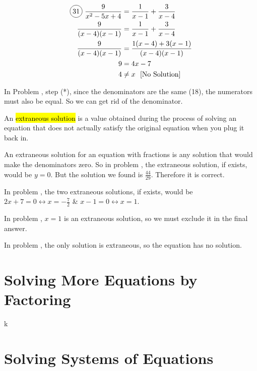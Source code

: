 \begin{multicols}{2}
\begin{align*}
  \circled{31}\ \frac{9}{x^{2}-5x+4}&=\frac{1}{x-1}+\frac{3}{x-4}\\
  \frac{9}{(x-4)(x-1)}&=\frac{1}{x-1}+\frac{3}{x-4}\\
  \frac{9}{(x-4)(x-1)}&=\frac{1(x-4)+3(x-1)}{(x-4)(x-1)}\\
  9&=4x-7\\
  4&\neq x\ \text{ [No Solution]}
\end{align*}
\end{multicols}

In Problem , step (*), since the denominators are the same (18), the numerators must also be equal. So we can get rid of the denominator.

\vspace{.4cm}

An \hl{extraneous solution} is a value obtained during the process of solving an equation that does not actually satisfy the original equation when you plug it back in.

An extraneous solution for an equation with fractions is any solution that would make the denominators zero. So in problem , the extraneous solution, if exists, would be $y=0$. But the solution we found is $\frac{44}{29}$. Therefore it is correct.

In problem , the two extraneous solutions, if exists, would be $2x+7=0\leftrightarrow x=-\frac{7}{2}$ \& $x-1=0 \leftrightarrow x=1$.

In problem , $x=1$ is an extraneous solution, so we must exclude it in the final answer.

In problem , the only solution is extraneous, so the equation has no solution.

\section{Solving More Equations by Factoring}

k

\section{Solving Systems of Equations}

%
%

